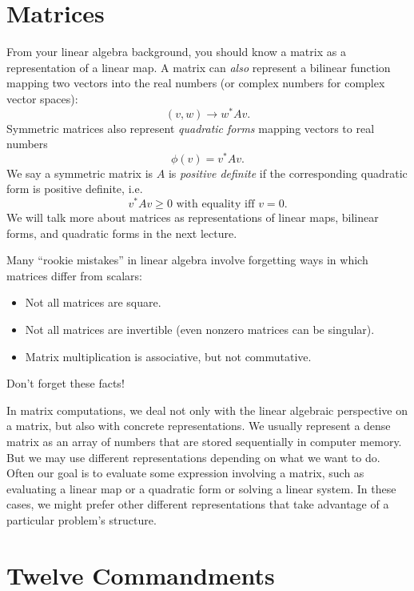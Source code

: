 \documentclass[12pt, leqno]{article}
\begin{document}

\section*{Matrices}

From your linear algebra background, you should know a matrix as a
representation of a linear map.  A matrix can {\em also} represent a
bilinear function mapping two vectors into the real numbers (or
complex numbers for complex vector spaces):
\[
  (v, w) \rightarrow w^* A v.
\]
Symmetric matrices also represent {\em quadratic forms} mapping
vectors to real numbers
\[
  \phi(v) = v^* A v.
\]
We say a symmetric matrix is $A$ is {\em positive definite} if the
corresponding quadratic form is positive definite, i.e.
\[
  v^* A v \geq 0 \mbox{ with equality iff } v = 0.
\]
We will talk more about matrices as representations of linear maps,
bilinear forms, and quadratic forms in the next lecture.

Many ``rookie mistakes'' in linear algebra involve forgetting ways in
which matrices differ from scalars:
\begin{itemize}
\item Not all matrices are square.
\item Not all matrices are invertible (even nonzero matrices can be
  singular).
\item Matrix multiplication is associative, but not commutative.
\end{itemize}
Don't forget these facts!

In matrix computations, we deal not only with the linear algebraic
perspective on a matrix, but also with concrete representations.  We
usually represent a dense matrix as an array of numbers that are
stored sequentially in computer memory.  But we may use different
representations depending on what we want to do.  Often our goal is to
evaluate some expression involving a matrix, such as evaluating a
linear map or a quadratic form or solving a linear system.  In these
cases, we might prefer other different representations that take
advantage of a particular problem's structure.

\section*{Twelve Commandments}
\end{document}
